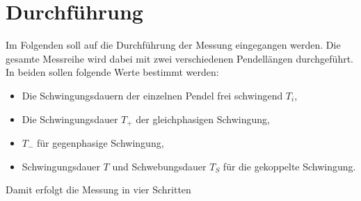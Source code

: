 \section{Durchführung}
\label{sec:Durchführung}
Im Folgenden soll auf die Durchführung der Messung eingegangen werden. Die gesamte
Messreihe wird dabei mit zwei verschiedenen Pendellängen durchgeführt. In beiden sollen
folgende Werte bestimmt werden:
\begin{itemize}
	\item Die Schwingungsdauern der einzelnen Pendel frei schwingend $T_i$,
	\item Die Schwingungsdauer $T_+$ der gleichphasigen Schwingung,
	\item $T_-$ für gegenphasige Schwingung,
	\item Schwingungsdauer $T$ und Schwebungsdauer $T_S$ für die gekoppelte
		Schwingung.
\end{itemize}
Damit erfolgt die Messung in vier Schritten
